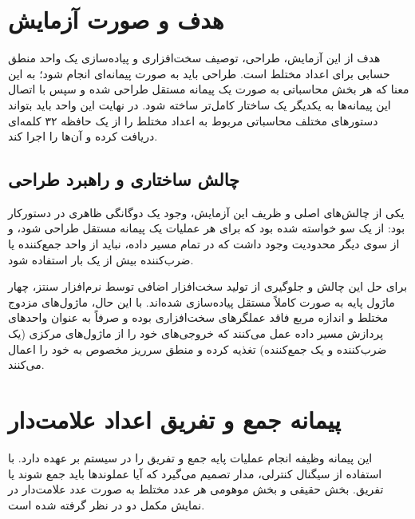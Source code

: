 \documentclass[11pt,a4paper]{article}
\begin{document}
\newpage
\tableofcontents
\newpage

\section{هدف و صورت آزمایش}
هدف از این آزمایش، طراحی، توصیف سخت‌افزاری و پیاده‌سازی یک واحد منطق حسابی برای اعداد مختلط است. طراحی باید به صورت پیمانه‌ای انجام شود؛ به این معنا که هر بخش محاسباتی به صورت یک پیمانه مستقل طراحی شده و سپس با اتصال این پیمانه‌ها به یکدیگر یک ساختار کامل‌تر ساخته شود. در نهایت این واحد باید بتواند دستورهای مختلف محاسباتی مربوط به اعداد مختلط را از یک حافظه ۳۲ کلمه‌ای دریافت کرده و آن‌ها را اجرا کند.

\subsection{چالش ساختاری و راهبرد طراحی}
یکی از چالش‌های اصلی و ظریف این آزمایش، وجود یک دوگانگی ظاهری در دستورکار بود: از یک سو خواسته شده بود که برای هر عملیات یک پیمانه مستقل طراحی شود، و از سوی دیگر محدودیت وجود داشت که در تمام مسیر داده، نباید از واحد جمع‌کننده یا ضرب‌کننده بیش از یک بار استفاده شود.

برای حل این چالش و جلوگیری از تولید سخت‌افزار اضافی توسط نرم‌افزار سنتز، چهار ماژول پایه به صورت کاملاً مستقل پیاده‌سازی شده‌اند. با این حال، ماژول‌های مزدوج مختلط و اندازه مربع فاقد عملگرهای سخت‌افزاری بوده و صرفاً به عنوان واحدهای پردازش مسیر داده عمل می‌کنند که خروجی‌های خود را از ماژول‌های مرکزی (یک ضرب‌کننده و یک جمع‌کننده) تغذیه کرده و منطق سرریز مخصوص به خود را اعمال می‌کنند. 

\section{پیمانه جمع و تفریق اعداد علامت‌دار}
این پیمانه وظیفه انجام عملیات پایه جمع و تفریق را در سیستم بر عهده دارد. با استفاده از سیگنال کنترلی، مدار تصمیم می‌گیرد که آیا عملوندها باید جمع شوند یا تفریق. بخش حقیقی و بخش موهومی هر عدد مختلط به صورت عدد علامت‌دار در نمایش مکمل دو در نظر گرفته شده است.
\end{document}
